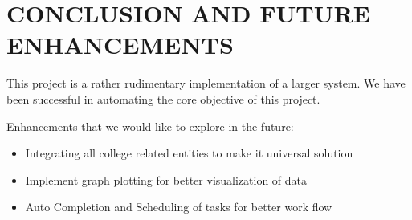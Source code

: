 \chapter{CONCLUSION AND FUTURE ENHANCEMENTS}
This project is a rather rudimentary implementation of a larger system.
We have been successful in automating the core objective of this project.

Enhancements that we would like to explore in the future:
\begin{itemize}
\item Integrating all college related entities to make it universal solution
\item Implement graph plotting for better visualization of data
\item Auto Completion and Scheduling of tasks for better work flow
\end{itemize}
\pagebreak
